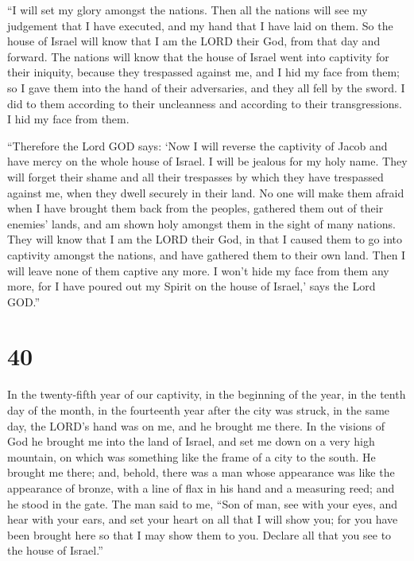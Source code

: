  ``I will set my glory amongst the nations. Then all the
nations will see my judgement that I have executed, and my hand that I
have laid on them.  So the house of Israel will know that I
am the LORD their God, from that day and forward.  The
nations will know that the house of Israel went into captivity for their
iniquity, because they trespassed against me, and I hid my face from
them; so I gave them into the hand of their adversaries, and they all
fell by the sword.  I did to them according to their
uncleanness and according to their transgressions. I hid my face from
them.

 ``Therefore the Lord GOD says: `Now I will reverse the
captivity of Jacob and have mercy on the whole house of Israel. I will
be jealous for my holy name.  They will forget their shame
and all their trespasses by which they have trespassed against me, when
they dwell securely in their land. No one will make them afraid
 when I have brought them back from the peoples, gathered
them out of their enemies' lands, and am shown holy amongst them in the
sight of many nations.  They will know that I am the LORD
their God, in that I caused them to go into captivity amongst the
nations, and have gathered them to their own land. Then I will leave
none of them captive any more.  I won't hide my face from
them any more, for I have poured out my Spirit on the house of Israel,'
says the Lord GOD.''

\hypertarget{section-38}{%
\section{40}\label{section-38}}

 In the twenty-fifth year of our captivity, in the beginning
of the year, in the tenth day of the month, in the fourteenth year after
the city was struck, in the same day, the LORD's hand was on me, and he
brought me there.  In the visions of God he brought me into
the land of Israel, and set me down on a very high mountain, on which
was something like the frame of a city to the south.  He
brought me there; and, behold, there was a man whose appearance was like
the appearance of bronze, with a line of flax in his hand and a
measuring reed; and he stood in the gate.  The man said to
me, ``Son of man, see with your eyes, and hear with your ears, and set
your heart on all that I will show you; for you have been brought here
so that I may show them to you. Declare all that you see to the house of
Israel.''


